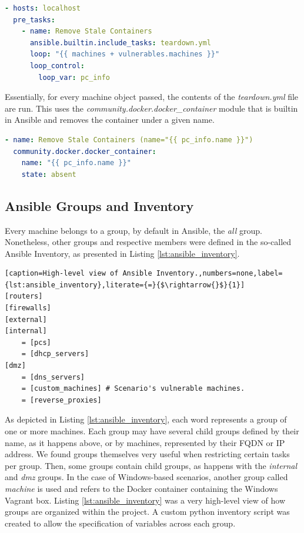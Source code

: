 \begin{lstlisting}[language=yaml,caption=Removal of Stale Containers.,numbers=none,label={lst:ansible_removal_of_stale_containers}]
- hosts: localhost
  pre_tasks:
    - name: Remove Stale Containers
      ansible.builtin.include_tasks: teardown.yml
      loop: "{{ machines + vulnerables.machines }}"
      loop_control:
        loop_var: pc_info
\end{lstlisting}

Essentially, for every machine object passed, the contents of the \textit{teardown.yml} file are run. This uses the \textit{community.docker.docker\_container} module that is builtin in Ansible and removes the container under a given name.

\begin{lstlisting}[language=yaml,caption=File \textit{teardown.yml}.,numbers=none,label={lst:ansible_teardown}]
- name: Remove Stale Containers (name="{{ pc_info.name }}")
  community.docker.docker_container:
    name: "{{ pc_info.name }}"
    state: absent
\end{lstlisting}

\subsection{Ansible Groups and Inventory} \label{sec:ansible_groups_inventory}


Every machine belongs to a group, by default in Ansible, the \textit{all} group. Nonetheless, other groups and respective members were defined in the so-called Ansible Inventory, as presented in Listing \ref{lst:ansible_inventory}.

\begin{lstlisting}[caption=High-level view of Ansible Inventory.,numbers=none,label={lst:ansible_inventory},literate={=}{$\rightarrow{}$}{1}]
[routers]
[firewalls]
[external]
[internal]
    = [pcs]
    = [dhcp_servers]
[dmz]
    = [dns_servers]
    = [custom_machines] # Scenario's vulnerable machines.
    = [reverse_proxies]
\end{lstlisting}

As depicted in Listing \ref{lst:ansible_inventory}, each word represents a group of one or more machines. Each group may have several child groups defined by their name, as it happens above, or by machines, represented by their FQDN or IP address. We found groups themselves very useful when restricting certain tasks per group. Then, some groups contain child groups, as happens with the \textit{internal} and \textit{dmz} groups. In the case of Windows-based scenarios, another group called \textit{machine} is used and refers to the Docker container containing the Windows Vagrant box. Listing \ref{lst:ansible_inventory} was a very high-level view of how groups are organized within the project. A custom python inventory script was created to allow the specification of variables across each group.

